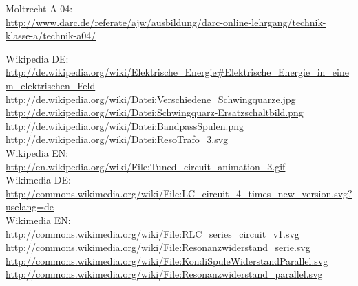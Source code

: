 \begin{thebibliography}{}
       Moltrecht A 04: \\
                    \url{http://www.darc.de/referate/ajw/ausbildung/darc-online-lehrgang/technik-klasse-a/technik-a04/}
    
        Wikipedia DE: \\
                    \url{http://de.wikipedia.org/wiki/Elektrische_Energie#Elektrische_Energie_in_einem_elektrischen_Feld}\\ 
                    \url{http://de.wikipedia.org/wiki/Datei:Verschiedene_Schwingquarze.jpg}\\
                    \url{http://de.wikipedia.org/wiki/Datei:Schwingquarz-Ersatzschaltbild.png}\\
                    \url{http://de.wikipedia.org/wiki/Datei:BandpassSpulen.png}\\
    				\url{http://de.wikipedia.org/wiki/Datei:ResoTrafo_3.svg}\\
    				
    	Wikipedia EN:\\
    				\url{http://en.wikipedia.org/wiki/File:Tuned_circuit_animation_3.gif}\\
    				
    	Wikimedia DE:\\
    				\url{http://commons.wikimedia.org/wiki/File:LC_circuit_4_times_new_version.svg?uselang=de}\\
   \vspace{1cm}
   	Wikimedia EN:\\
   					\url{http://commons.wikimedia.org/wiki/File:RLC_series_circuit_v1.svg}\\
   					\url{http://commons.wikimedia.org/wiki/File:Resonanzwiderstand_serie.svg}\\
   					\url{http://commons.wikimedia.org/wiki/File:KondiSpuleWiderstandParallel.svg}\\
   					\url{http://commons.wikimedia.org/wiki/File:Resonanzwiderstand_parallel.svg}\\
   				  					
\end{thebibliography} 


